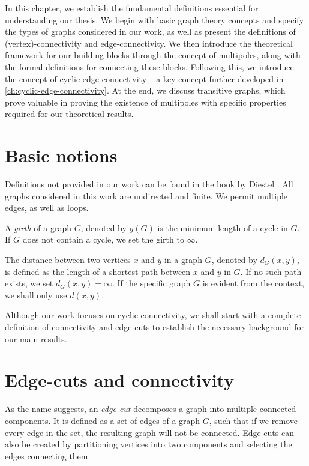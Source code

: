 \documentclass[12pt, twoside]{book}
\begin{document}
In this chapter, we establish the fundamental definitions essential for understanding our thesis. We begin with basic graph theory concepts and specify the types of graphs considered in our work, as well as present the definitions of (vertex)-connectivity and edge-connectivity. We then introduce the theoretical framework for our building blocks through the concept of multipoles, along with the formal definitions for connecting these blocks. Following this, we introduce the concept of cyclic edge-connectivity -- a key concept further developed in \cref{ch:cyclic-edge-connectivity}. At the end, we discuss transitive graphs, which prove valuable in proving the existence of multipoles with specific properties required for our theoretical results.

\section{Basic notions}

Definitions not provided in our work can be found in the book  by Diestel \cite{Diestel}. All graphs considered in this work are undirected and finite. We permit multiple edges, as well as loops.

A \textit{girth} of a graph $G$, denoted by $g(G)$ is the minimum length of a cycle in $G$. If $G$ does not contain a cycle, we set the girth to $\infty$.

The distance between two vertices $x$ and $y$ in a graph $G$, denoted by $d_G(x,y)$, is defined as the length of a shortest path between $x$ and $y$ in $G$. If no such path exists, we set $d_G(x,y)=\infty$. If the specific graph $G$ is evident from the context, we shall only use $d(x,y)$.

Although our work focuses on cyclic connectivity, we shall start with a complete definition of connectivity and edge-cuts to establish the necessary background for our main results.

\section{Edge-cuts and connectivity}\label{sec:edge-cuts}

As the name suggests, an \textit{edge-cut} decomposes a graph into multiple connected components. It is defined as a set of edges of a graph $G$, such that if we remove every edge in the set, the resulting graph will not be connected. Edge-cuts can also be created by partitioning vertices into two components and selecting the edges connecting them.
\end{document}
